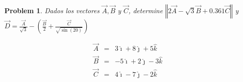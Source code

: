 \documentclass{article}
\newtheorem{problem}[theorem]{Problem}
\begin{document}
\begin{problem}
\bigskip Dados los vectores $\vec{A},\vec{B}$ y $\vec{C}$, determine $%
\left\Vert 2\vec{A}-\sqrt{3}\vec{B}+0.361\vec{C}\right\Vert $ y $\vec{D}=%
\frac{\vec{A}}{\sqrt{3}}-\left( \frac{\vec{B}}{2}+\frac{\vec{C}}{\sqrt{\sin
(20)}}\right) $
\end{problem}

\begin{eqnarray*}
\vec{A} &=&3\hat{\imath}+8\hat{\jmath}+5\hat{k} \\
\vec{B} &=&-5\hat{\imath}+2\hat{\jmath}-3\hat{k} \\
\vec{C} &=&4\hat{\imath}-7\hat{\jmath}-2\hat{k}
\end{eqnarray*}
\end{document}
